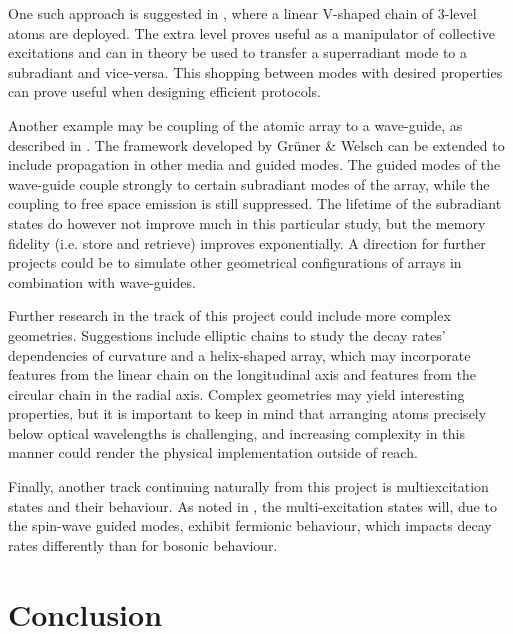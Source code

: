 \documentclass{article}
\begin{document}
One such approach is suggested in \cite{Fayard}, where a linear V-shaped chain of 3-level atoms are deployed. The extra level proves useful as a manipulator of collective excitations and can in theory be used to transfer a superradiant mode to a subradiant and vice-versa. This shopping between modes with desired properties can prove useful when designing efficient protocols. 

Another example may be coupling of the atomic array to a wave-guide, as described in \cite[Section IV]{Asenjo}. The framework developed by Grüner \& Welsch \cite{Gruner} can be extended to include propagation in other media and guided modes. The guided modes of the wave-guide couple strongly to certain subradiant modes of the array, while the coupling to free space emission is still suppressed. The lifetime of the subradiant states do however not improve much in this particular study, but the memory fidelity (i.e. store and retrieve) improves exponentially. A direction for further projects could be to simulate other geometrical configurations of arrays in combination with wave-guides. 

Further research in the track of this project could include more complex geometries. Suggestions include elliptic chains to study the decay rates' dependencies of curvature and a helix-shaped array, which may incorporate features from the linear chain on the longitudinal axis and features from the circular chain in the radial axis. Complex geometries may yield interesting properties, but it is important to keep in mind that arranging atoms precisely below optical wavelengths is challenging, and increasing complexity in this manner could render the physical implementation outside of reach. 

Finally, another track continuing naturally from this project is multiexcitation states and their behaviour. As noted in \cite{Asenjo}, the multi-excitation states will, due to the spin-wave guided modes, exhibit fermionic behaviour, which impacts decay rates differently than for bosonic behaviour. 

\section{Conclusion}
\end{document}
